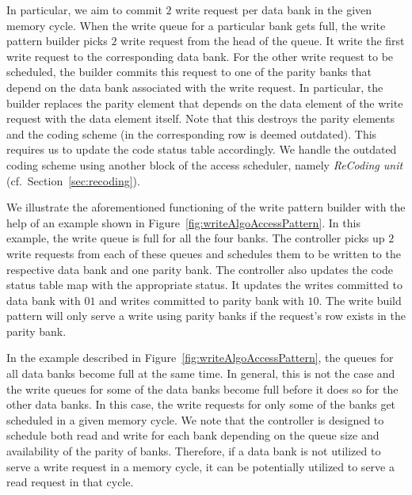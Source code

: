 In particular, we aim to commit $2$ write request per data bank in the given memory cycle. When the write queue for a particular bank gets full, the write pattern builder picks $2$ write request from the head of the queue. It write the first write request to the corresponding data bank. For the other write request to be scheduled, the builder commits this request to one of the parity banks that depend on the data bank associated with the write request. {\color{blue}In particular, the builder replaces the parity element that depends on the data element of the write request with the data element itself. Note that this destroys the parity elements and the coding scheme (in the corresponding row is deemed outdated).} This requires us to update the code status table accordingly. We handle the outdated coding scheme using another block of the access scheduler, namely {\em ReCoding unit} (cf.~Section~\ref{sec:recoding}).


We illustrate the aforementioned functioning of the write pattern builder with the help of an example shown in Figure~\ref{fig:writeAlgoAccessPattern}. In this example, the write queue is full for all the four banks. The controller picks up $2$ write requests from each of these queues and schedules them to be written to the respective data bank and one parity bank. The controller also updates the code status table map with the appropriate status. It updates the writes committed to data bank with $01$ and writes committed to parity bank with $10$. {\color{blue}The write build pattern will only serve a write using parity banks if the request's row exists in the parity bank.}


\begin{remark}
In the example described in Figure~\ref{fig:writeAlgoAccessPattern}, the queues for all data banks become full at the same time. In general, this is not the case and the write queues for some of the data banks become full before it does so for the other data banks. In this case, the write requests for only some of the banks get scheduled in a given memory cycle.{\color{blue} We note that the controller is designed to schedule both read and write for each bank depending on 
the queue size and availability of the parity of banks. Therefore, if a data bank is not utilized to serve a write request in a memory cycle, it can be potentially utilized to serve a read request in that cycle.} 
\end{remark}

